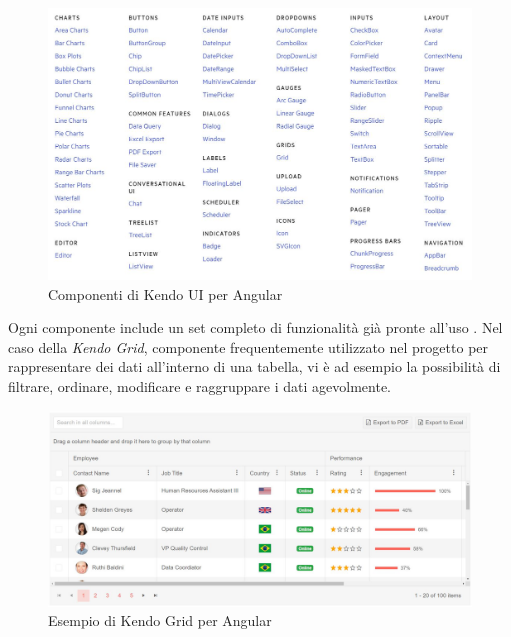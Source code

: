 \begin{figure}[h!]
\begin{center}
  \includegraphics[width=15cm]{images/kendo_components.JPG}
  \caption{Componenti di Kendo UI per Angular}
\end{center}
\end{figure}
\pagebreak
Ogni componente include un set completo di funzionalità già pronte all'uso \cite{KENDO}. Nel caso della \textit{Kendo Grid}, componente frequentemente utilizzato nel progetto per rappresentare dei dati all'interno di una tabella, vi è ad esempio la possibilità di filtrare, ordinare, modificare e raggruppare i dati agevolmente.
\begin{figure}[ht!]
\begin{center}
  \includegraphics[width=14cm]{images/kendo_grid.JPG}
  \caption{Esempio di Kendo Grid per Angular}
\end{center}
\end{figure}

\pagebreak
